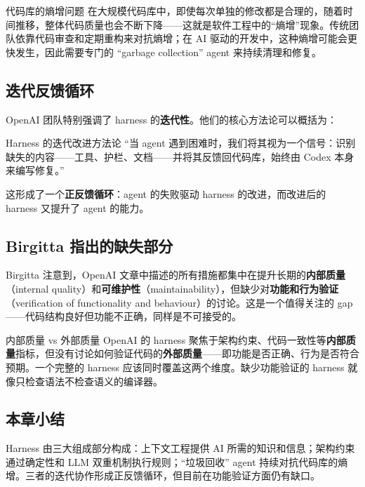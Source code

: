 \documentclass[a4paper]{article}
\begin{document}
\begin{warningbox}{代码库的熵增问题}
在大规模代码库中，即使每次单独的修改都是合理的，随着时间推移，整体代码质量也会不断下降------这就是软件工程中的``熵增''现象。传统团队依靠代码审查和定期重构来对抗熵增；在 AI 驱动的开发中，这种熵增可能会更快发生，因此需要专门的 ``garbage collection'' agent 来持续清理和修复。
\end{warningbox}

\subsection{迭代反馈循环}

OpenAI 团队特别强调了 harness 的\textbf{迭代性}。他们的核心方法论可以概括为：

\begin{importantbox}{Harness 的迭代改进方法论}
``当 agent 遇到困难时，我们将其视为一个信号：识别缺失的内容------工具、护栏、文档------并将其反馈回代码库，始终由 Codex 本身来编写修复。''

这形成了一个\textbf{正反馈循环}：agent 的失败驱动 harness 的改进，而改进后的 harness 又提升了 agent 的能力。
\end{importantbox}

\subsection{Birgitta 指出的缺失部分}

Birgitta 注意到，OpenAI 文章中描述的所有措施都集中在提升长期的\textbf{内部质量}（internal quality）和\textbf{可维护性}（maintainability），但缺少对\textbf{功能和行为验证}（verification of functionality and behaviour）的讨论。这是一个值得关注的 gap------代码结构良好但功能不正确，同样是不可接受的。

\begin{warningbox}{内部质量 vs 外部质量}
OpenAI 的 harness 聚焦于架构约束、代码一致性等\textbf{内部质量}指标，但没有讨论如何验证代码的\textbf{外部质量}------即功能是否正确、行为是否符合预期。一个完整的 harness 应该同时覆盖这两个维度。缺少功能验证的 harness 就像只检查语法不检查语义的编译器。
\end{warningbox}

\subsection{本章小结}

Harness 由三大组成部分构成：上下文工程提供 AI 所需的知识和信息；架构约束通过确定性和 LLM 双重机制执行规则；``垃圾回收'' agent 持续对抗代码库的熵增。三者的迭代协作形成正反馈循环，但目前在功能验证方面仍有缺口。
\end{document}
